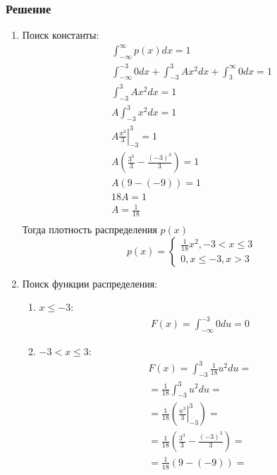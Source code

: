 \documentclass[12pt]{article}
\begin{document}
\subsubsection*{Решение}
\begin{enumerate}
	\item Поиск константы: \\
	      \begin{gather*}
		      \int_{-\infty}^{\infty}p(x)dx = 1 \\
		      \int_{-\infty}^{-3}0dx + \int_{-3}^{3}Ax^2dx + \int_{3}^{\infty}0dx = 1 \\
		      \int_{-3}^{3}Ax^2dx = 1 \\
		      A\int_{-3}^{3}x^2dx = 1 \\
		      A\left.\frac{x^3}{3}\right|^3_{-3} = 1 \\
		      A\left(\frac{3^3}{3} - \frac{(-3)^3}{3}\right) = 1 \\
		      A\left(9 - (-9)\right) = 1 \\
		      18A = 1 \\
		      A = \frac{1}{18} \\
	      \end{gather*}
	      Тогда плотность распределения $p(x)$
	      \[
		      p(x) =
		      \begin{cases}
			      \frac{1}{18}x^2, -3 < x \leq 3 \\
			      0, x \leq -3, x > 3
		      \end{cases}
	      \]
	\item Поиск функции распределения: \\
	      \begin{enumerate}
		      \item $x \leq -3$:
		            \begin{gather*}
			            F(x) = \int_{-\infty}^{-3}0du = 0
		            \end{gather*}
		      \item $-3 < x \leq 3$:
		            \begin{gather*}
			            F(x) = \int_{-3}^3 \frac{1}{18}u^2du = \\
			            = \frac{1}{18}\int_{-3}^3u^2du = \\
			            = \frac{1}{18}\left(\left.\frac{u^3}{3}\right|_{-3}^{3}\right) = \\
			            = \frac{1}{18}\left(\frac{3^3}{3} - \frac{(-3)^3}{3}\right) = \\
			            = \frac{1}{18}\left(9 - (-9)\right) = \\

\end{gather*}
\end{enumerate}
\end{enumerate}
\end{document}
